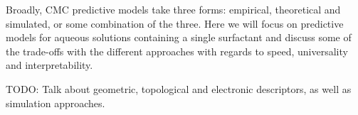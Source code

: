 Broadly, CMC predictive models take three forms: empirical, theoretical and
simulated, or some combination of the three. Here we will focus on predictive
models for aqueous solutions containing a single surfactant and discuss some of the trade-offs
with the different approaches with regards to speed, universality and interpretability.

TODO: Talk about geometric, topological and electronic descriptors, as well as simulation approaches.